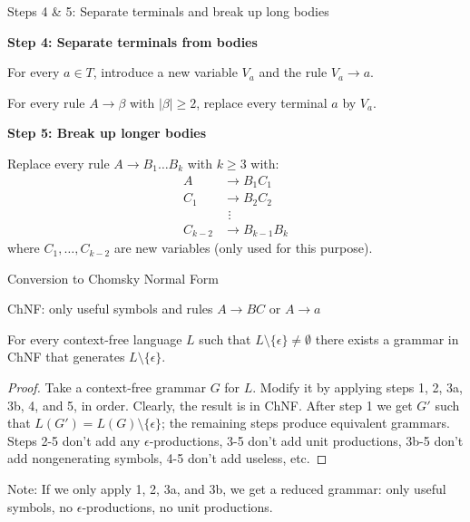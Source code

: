 \documentclass[handout]{beamer}
\begin{document}
\begin{frame}{Steps 4 \& 5: Separate terminals and break up long bodies}

	\textbf{Step 4: Separate terminals from bodies}

	For every $a\in T$, introduce a new variable $V_a$ and the rule $V_a\to a$.

	For every rule $A\to\beta$ with $|\beta|\geq 2$, replace every terminal $a$ by $V_a$.
	
	\bigskip

	\textbf{Step 5: Break up longer bodies}

	Replace every rule $A\to B_1\dots B_k$ with $k\geq 3$ with:
	\begin{align*}
		A&\to B_1 C_1\\
		C_1&\to B_2 C_2\\
		&\ \,\vdots\\
		C_{k-2}&\to B_{k-1}B_k
	\end{align*}
	where $C_1,\dots,C_{k-2}$ are new variables (only used for this purpose).
	
\end{frame}


\begin{frame}{Conversion to Chomsky Normal Form}

	ChNF: only useful symbols and rules \alert{$A\to BC$} or \alert{$A\to a$}
	
	\begin{theorem}
		For every context-free language $L$ such that $L\setminus \{\epsilon\}\neq \emptyset$ there exists a grammar in ChNF that generates $L\setminus \{\epsilon\}$.
	\end{theorem}
	\begin{proof}
		Take a context-free grammar $G$ for $L$. Modify it by applying steps 1, 2, 3a, 3b, 4, and 5, in order. Clearly, the result is in ChNF. After step 1 we get $G'$ such that $L(G')=L(G)\setminus \{\epsilon\}$; the remaining steps produce equivalent grammars. Steps 2-5 don't add any $\epsilon$-productions, 3-5 don't add unit productions, 3b-5 don't add nongenerating symbols, 4-5 don't add useless, etc.
	\end{proof}

	Note: If we only apply 1, 2, 3a, and 3b, we get a \alert{reduced} grammar: only useful symbols, no $\epsilon$-productions, no unit productions.

\end{frame}
\end{document}
